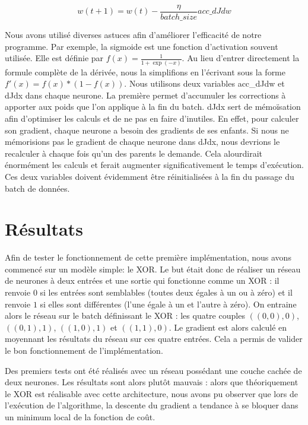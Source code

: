 \begin{equation}
w(t+1) = w(t) - \frac{\eta}{batch\_size}acc\_dJdw
\label{mise_a_jour_poids_batch}
\end{equation}

Nous avons utilisé diverses astuces afin d'améliorer l'efficacité de notre programme. Par exemple, la sigmoide est une fonction d'activation souvent utilisée. Elle est définie par $f(x) = \frac{1}{1+\exp(-x)}$. Au lieu d'entrer directement la formule complète de la dérivée, nous la simplifions en l'écrivant sous la forme $f'(x) = f(x) * (1 - f(x))$.
Nous utilisons deux variables acc\_dJdw et dJdx dans chaque neurone. La première permet d'accumuler les corrections à apporter aux poids que l'on applique à la fin du batch. dJdx sert de mémoïsation afin d'optimiser les calculs et de ne pas en faire d'inutiles. En effet, pour calculer son gradient, chaque neurone a besoin des gradients de ses enfants. Si nous ne mémorisions pas le gradient de chaque neurone dans dJdx, nous devrions le recalculer à chaque fois qu'un des parents le demande. Cela alourdirait énormément les calculs et ferait augmenter significativement le temps d'exécution. Ces deux variables doivent évidemment être réinitialisées à la fin du passage du batch de données.

\section{Résultats}
\label{sec:Résultats}
Afin de tester le fonctionnement de cette première implémentation, nous avons commencé sur un modèle simple: le XOR. Le but était donc de réaliser un réseau de neurones à deux entrées et une sortie qui fonctionne comme un XOR : il renvoie $0$ si les entrées sont semblables (toutes deux égales à un ou à zéro) et il renvoie $1$ si elles sont différentes (l'une égale à un et l'autre à zéro). On entraine alors le réseau sur le batch définissant le XOR : les quatre couples $((0,0),0)$, $((0,1),1)$, $((1,0),1)$ et $((1,1),0)$. Le gradient est alors calculé en moyennant les résultats du réseau sur ces quatre entrées.
Cela a permis de valider le bon fonctionnement de l'implémentation.

Des premiers tests ont été réalisés avec un réseau possédant une couche cachée de deux neurones. Les résultats sont alors plutôt mauvais : alors que théoriquement le XOR est réalisable avec cette architecture, nous avons pu observer que lors de l'exécution de l'algorithme, la descente du gradient a tendance à se bloquer dans un minimum local de la fonction de coût. 

